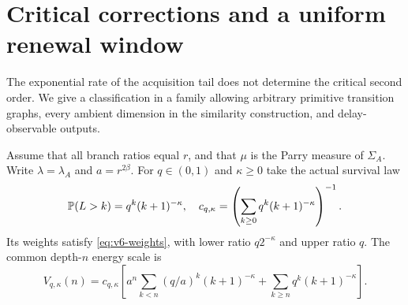 \section{Critical corrections and a uniform renewal window}\label{sec:v6-critical}
The exponential rate of the acquisition tail does not determine the
critical second order. We give a classification in a family allowing
arbitrary primitive transition graphs, every ambient dimension in the
similarity construction, and delay-observable outputs.

Assume that all branch ratios equal $r$, and that $\mu$ is the Parry
measure of $\Sigma_A$. Write $\lambda=\lambda_A$ and $a=r^{2\beta}$.
For $q\in(0,1)$ and $\kappa\ge0$ take the actual survival law
\begin{equation}
 \mathbb P(L>k)=q^k(k+1)^{-\kappa},\quad
 c_{q,\kappa}=\left(\sum_{k\ge0}q^k(k+1)^{-\kappa}\right)^{-1}.
                                                        \label{eq:v6-polynomial-tail}
\end{equation}
Its weights satisfy \eqref{eq:v6-weights}, with lower ratio
$q2^{-\kappa}$ and upper ratio $q$. The common depth-$n$ energy scale is
\begin{equation}
 V_{q,\kappa}(n)=c_{q,\kappa}\left[
 a^n\sum_{k<n}(q/a)^k(k+1)^{-\kappa}
       +\sum_{k\ge n}q^k(k+1)^{-\kappa}\right].          \label{eq:v6-depth-profile}
\end{equation}

